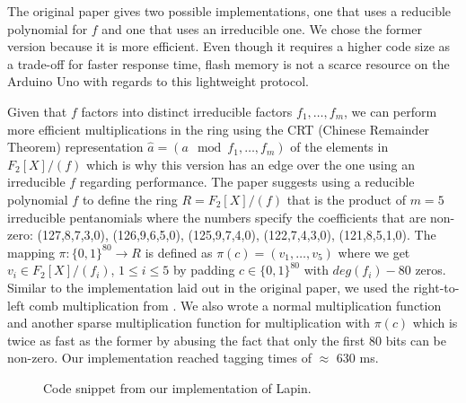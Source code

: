 \documentclass[11pt,a4paper]{article}
\begin{document}
The original paper \cite{lapin} gives two possible implementations, one that uses a reducible polynomial for $f$ and one that uses an irreducible one.
We chose the former version because it is more efficient. Even though it requires a higher code size as a trade-off for faster response time, flash memory is not a scarce resource on the Arduino Uno with regards to this lightweight protocol. 

Given that $f$ factors into distinct irreducible factors $f_1,\dots ,f_m$, we can perform more efficient multiplications in the ring using the CRT (Chinese Remainder Theorem) representation $\hat{a} = (a \mod f_1, \dots ,f_m)$ of the elements in $F_2[X] / (f)$ which is why this version has an edge over the one using an irreducible $f$ regarding performance. 
The paper suggests using a reducible polynomial $f$ to define the ring $R = F_2[X] / (f)$ that is the product of $m = 5$ irreducible pentanomials where the numbers specify the coefficients that are non-zero: (127,8,7,3,0), (126,9,6,5,0), (125,9,7,4,0), (122,7,4,3,0), (121,8,5,1,0). 
The mapping $\pi: \{0, 1\}^{80} \rightarrow R$ is defined as $\pi(c) = (v_1,\dots, v_5)$ where we get $v_i \in F_2[X] / (f_i)$, $1 \leq i \leq 5$ by  padding $c \in \{0,1\}^{80}$ with $deg(f_i) - 80$ zeros.
Similar to the implementation laid out in the original paper, we used the right-to-left comb multiplication from \cite{hankerson}. We also wrote a normal multiplication function and another sparse multiplication function for multiplication with $\pi(c)$ which is twice as fast as the former by abusing the fact that only the first 80 bits can be non-zero. Our implementation reached tagging times of $\approx$ 630 ms.

\begin{figure}[h]
	\caption{Code snippet from our implementation of Lapin. }
	\label{auth_code1}
\end{figure}

\newpage
{}


\end{document}
